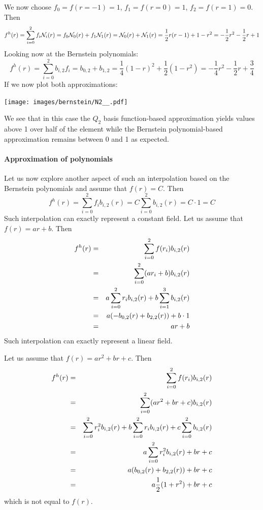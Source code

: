We now choose $f_0=f(r=-1)=1$, $f_1=f(r=0)=1$, $f_2=f(r=1)=0$. Then 
\[
f^h(r) 
= \sum_{i=0}^2 f_i {\mathcal{N}}_i(r) 
= f_0 {\mathcal{N}}_0(r) + f_1 {\mathcal{N}}_1(r) 
= {\mathcal{N}}_0(r) + {\mathcal{N}}_1(r) 
= \frac{1}{2}r(r-1) + 1-r^2 = -\frac{1}{2}r^2 -\frac{1}{2}r +1  
\]
Looking now at the Bernstein polynomials:
\[
f^h(r) 
= \sum_{i=0}^2 b_{i,2} f_i 
= b_{0,2} + b_{1,2} = \frac{1}{4}(1-r)^2 + \frac{1}{2}(1-r^2)
= -\frac{1}{4}r^2-\frac{1}{2}r+\frac{3}{4}
\]
If we now plot both approximations:
\begin{center}
\texttt{[image: images/bernstein/N2\_\_.pdf]}
\end{center}
We see that in this case the $Q_2$ basis function-based approximation yields values 
above 1 over half of the element while the Bernstein polynomial-based 
approximation remains between 0 and 1 as expected.

\paragraph{Approximation of polynomials}
Let us now explore another aspect of such an interpolation based on the Bernstein polynomials
and assume that $f(r)=C$. Then 
\[
f^h(r) = \sum_{i=0}^2 f_i b_{i,2}(r) = C \sum_{i=0}^2 b_{i,2}(r) = C \cdot 1 = C
\]
Such interpolation can exactly represent a constant field. 
Let us assume that $f(r)=ar+b$. Then 
\begin{eqnarray}
f^h(r) 
&=& \sum_{i=0}^2 f(r_i) b_{i,2}(r)  \nonumber\\
&=& \sum_{i=0}^2 (ar_i+b) b_{i,2}(r) \nonumber\\
&=& a\sum_{i=0}^2 r_i b_{i,2}(r) + b \sum_{i=1}^3 b_{i,2}(r) \nonumber\\
&=& a (-b_{0,2}(r)+b_{2,2}(r)) + b \cdot 1 \nonumber\\
&=& ar+b 
\end{eqnarray}
Such interpolation can exactly represent a linear field. 

Let us assume that $f(r)=ar^2+br+c$. Then 
\begin{eqnarray}
f^h(r) 
&=& \sum_{i=0}^2 f(r_i) b_{i,2}(r) \nonumber \\
&=& \sum_{i=0}^2 (ar^2+br+c) b_{i,2}(r) \nonumber\\
&=& \sum_{i=0}^2 r_i^2 b_{i,2}(r) + b \sum_{i=0}^2 r_i b_{i,2}(r) + c \sum_{i=0}^2 b_{i,2}(r) \nonumber\\
&=& a\sum_{i=0}^2 r_i^2 b_{i,2}(r) + br + c \nonumber\\
&=& a (b_{0,2}(r) + b_{2,2}(r)) + br + c \nonumber\\
&=& a\frac{1}{2}(1+r^2)  + br + c 
\end{eqnarray}
which is not equal to $f(r)$.

